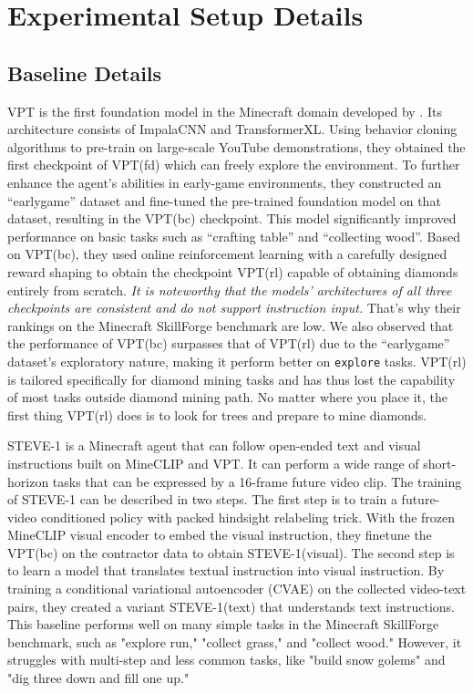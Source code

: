 \documentclass[11pt, a4paper, logo, one column]{craftjarvis}
\begin{document}


\section{Experimental Setup Details}

\subsection{Baseline Details} \label{appendix:baseline}
VPT is the first foundation model in the Minecraft domain developed by \cite{vpt}. Its architecture consists of ImpalaCNN and TransformerXL. Using behavior cloning algorithms to pre-train on large-scale YouTube demonstrations, they obtained the first checkpoint of VPT(fd) which can freely explore the environment. To further enhance the agent's abilities in early-game environments, they constructed an ``earlygame'' dataset and fine-tuned the pre-trained foundation model on that dataset, resulting in the VPT(bc) checkpoint. This model significantly improved performance on basic tasks such as ``crafting table'' and ``collecting wood''. Based on VPT(bc), they used online reinforcement learning with a carefully designed reward shaping to obtain the checkpoint VPT(rl) capable of obtaining diamonds entirely from scratch. \emph{It is noteworthy that the models' architectures of all three checkpoints are consistent and do not support instruction input.} That's why their rankings on the Minecraft SkillForge benchmark are low. We also observed that the performance of VPT(bc) surpasses that of VPT(rl) due to the ``earlygame'' dataset's exploratory nature, making it perform better on \texttt{explore} tasks. VPT(rl) is tailored specifically for diamond mining tasks and has thus lost the capability of most tasks outside diamond mining path. No matter where you place it, the first thing VPT(rl) does is to look for trees and prepare to mine diamonds.

STEVE-1 is a Minecraft agent that can follow open-ended text and visual instructions built on MineCLIP \citep{minedojo} and VPT. It can perform a wide range of short-horizon tasks that can be expressed by a 16-frame future video clip. The training of STEVE-1 can be described in two steps. The first step is to train a future-video conditioned policy with packed hindsight relabeling trick. With the frozen MineCLIP visual encoder to embed the visual instruction, they finetune the VPT(bc) on the contractor data to obtain STEVE-1(visual). The second step is to learn a model that translates textual instruction into visual instruction. By training a conditional variational autoencoder (CVAE) on the collected video-text pairs, they created a variant STEVE-1(text) that understands text instructions. This baseline performs well on many simple tasks in the Minecraft SkillForge benchmark, such as "explore run," "collect grass," and "collect wood." However, it struggles with multi-step and less common tasks, like "build snow golems" and "dig three down and fill one up."
\end{document}
